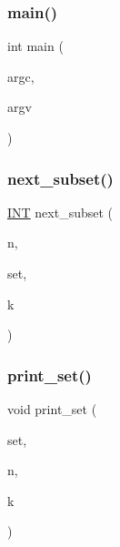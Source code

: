 \mbox{\label{test2_8_c_a3c04138a5bfe5d72780bb7e82a18e627}} 
\subsubsection{\texorpdfstring{main()}{main()}}
{\footnotesize\ttfamily int main (\begin{DoxyParamCaption}\item[{int}]{argc,  }\item[{char $\ast$$\ast$}]{argv }\end{DoxyParamCaption})}

\mbox{\label{test2_8_c_a24bf1c11cd115912ff0cd4efc8170025}} 
\subsubsection{\texorpdfstring{next\+\_\+subset()}{next\_subset()}}
{\footnotesize\ttfamily \mbox{\hyperlink{galois_8h_a09fddde158a3a20bd2dcadb609de11dc}{I\+NT}} next\+\_\+subset (\begin{DoxyParamCaption}\item[{\mbox{\hyperlink{galois_8h_a09fddde158a3a20bd2dcadb609de11dc}{I\+NT}}}]{n,  }\item[{\mbox{\hyperlink{galois_8h_a09fddde158a3a20bd2dcadb609de11dc}{I\+NT}} $\ast$}]{set,  }\item[{\mbox{\hyperlink{galois_8h_a09fddde158a3a20bd2dcadb609de11dc}{I\+NT}} \&}]{k }\end{DoxyParamCaption})}

\mbox{\label{test2_8_c_a237e0c079f87580d6f54bcb35465dec0}} 
\subsubsection{\texorpdfstring{print\+\_\+set()}{print\_set()}}
{\footnotesize\ttfamily void print\+\_\+set (\begin{DoxyParamCaption}\item[{\mbox{\hyperlink{galois_8h_a09fddde158a3a20bd2dcadb609de11dc}{I\+NT}} $\ast$}]{set,  }\item[{\mbox{\hyperlink{galois_8h_a09fddde158a3a20bd2dcadb609de11dc}{I\+NT}}}]{n,  }\item[{\mbox{\hyperlink{galois_8h_a09fddde158a3a20bd2dcadb609de11dc}{I\+NT}}}]{k }\end{DoxyParamCaption})}

